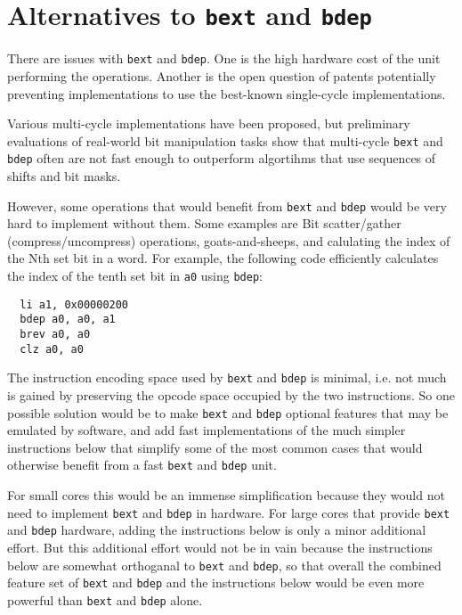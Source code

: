 \chapter{Alternatives to \texttt{bext} and \texttt{bdep}}

There are issues with \texttt{bext} and \texttt{bdep}. One is the high hardware cost
of the unit performing the operations. Another is the open question of patents potentially
preventing implementations to use the best-known single-cycle implementations.

Various multi-cycle implementations have been proposed, but preliminary evaluations of
real-world bit manipulation tasks show that multi-cycle \texttt{bext} and \texttt{bdep}
often are not fast enough to outperform algortihms that use sequences of shifts and bit
masks.

However, some operations that would benefit from \texttt{bext} and \texttt{bdep} would
be very hard to implement without them. Some examples are Bit scatter/gather
(compress/uncompress) operations, goats-and-sheeps, and calulating the index of the Nth
set bit in a word. For example, the following code efficiently calculates the
index of the tenth set bit in {\tt a0} using \texttt{bdep}:

\begin{verbatim}
  li a1, 0x00000200
  bdep a0, a0, a1
  brev a0, a0
  clz a0, a0
\end{verbatim}

The instruction encoding space used by \texttt{bext} and \texttt{bdep} is
minimal, i.e. not much is gained by preserving the opcode space occupied
by the two instructions. So one possible solution would be to make \texttt{bext}
and \texttt{bdep} optional features that may be emulated by software, and add
fast implementations of the much simpler instructions below that simplify some
of the most common cases that would otherwise benefit from a fast \texttt{bext}
and \texttt{bdep} unit.

For small cores this would be an immense simplification because they would not
need to implement \texttt{bext} and \texttt{bdep} in hardware. For large cores
that provide \texttt{bext} and \texttt{bdep} hardware, adding the instructions
below is only a minor additional effort. But this additional effort would not
be in vain because the instructions below are somewhat orthoganal to
\texttt{bext} and \texttt{bdep}, so that overall the combined feature set of
\texttt{bext} and \texttt{bdep} and the instructions below would be even more
powerful than \texttt{bext} and \texttt{bdep} alone.

